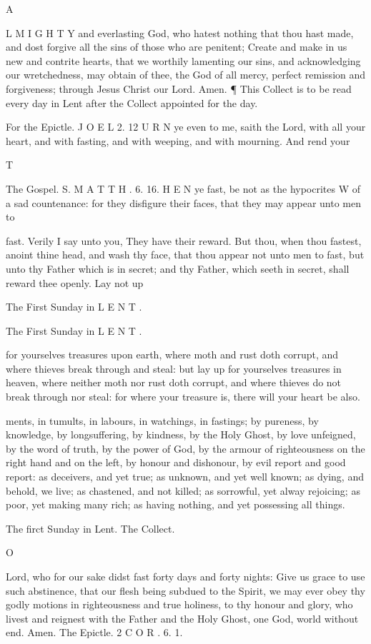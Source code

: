 A

L M I G H T Y and everlasting God, who hatest nothing that thou hast made, and dost forgive all the sins of those who are penitent; Create and make in us new and contrite hearts, that we worthily lamenting our sins, and acknowledging our wretchedness, may obtain of thee, the God of all mercy, perfect remission and forgiveness; through Jesus Christ our Lord. Amen. ¶ This Collect is to be read every day in Lent after the Collect appointed for the day.

For the Epictle. J O E L 2. 12 U R N ye even to me, saith the Lord, with all your heart, and with fasting, and with weeping, and with mourning. And rend your

T

The Gospel. S. M A T T H . 6. 16. H E N ye fast, be not as the hypocrites W of a sad countenance: for they disfigure their faces, that they may appear unto men to

fast. Verily I say unto you, They have their reward. But thou, when thou fastest, anoint thine head, and wash thy face, that thou appear not unto men to fast, but unto thy Father which is in secret; and thy Father, which seeth in secret, shall reward thee openly. Lay not up

The First Sunday in L E N T .

The First Sunday in L E N T .

for yourselves treasures upon earth, where moth and rust doth corrupt, and where thieves break through and steal: but lay up for yourselves treasures in heaven, where neither moth nor rust doth corrupt, and where thieves do not break through nor steal: for where your treasure is, there will your heart be also.

ments, in tumults, in labours, in watchings, in fastings; by pureness, by knowledge, by longsuffering, by kindness, by the Holy Ghost, by love unfeigned, by the word of truth, by the power of God, by the armour of righteousness on the right hand and on the left, by honour and dishonour, by evil report and good report: as deceivers, and yet true; as unknown, and yet well known; as dying, and behold, we live; as chastened, and not killed; as sorrowful, yet alway rejoicing; as poor, yet making many rich; as having nothing, and yet possessing all things.

The firct Sunday in Lent. The Collect.

O

Lord, who for our sake didst fast forty days and forty nights: Give us grace to use such abstinence, that our flesh being subdued to the Spirit, we may ever obey thy godly motions in righteousness and true holiness, to thy honour and glory, who livest and reignest with the Father and the Holy Ghost, one God, world without end. Amen. The Epictle. 2 C O R . 6. 1.

